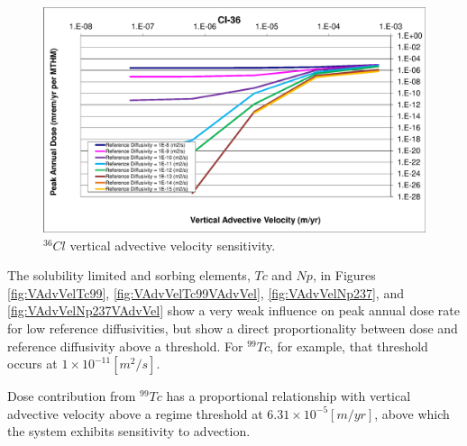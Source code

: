 \begin{figure}[htp!]
\begin{minipage}[b]{0.45\linewidth}
\centering
\includegraphics[width=\textwidth]{./chapters/nuclide_sensitivity/clay/AdvVelAndDiffCoeffEBSFail/Cl-36-VAdvVel.eps}
\caption{$^{36}Cl$ vertical advective velocity sensitivity.}
\label{fig:VAdvVelCl36VAdvVel}
\end{minipage}
\end{figure}

The solubility limited and sorbing elements, $Tc$ and $Np$, in Figures 
\ref{fig:VAdvVelTc99}, \ref{fig:VAdvVelTc99VAdvVel}, \ref{fig:VAdvVelNp237}, and 
\ref{fig:VAdvVelNp237VAdvVel} show a very weak influence on peak annual dose 
rate for low reference diffusivities, but show a direct proportionality between 
dose and reference diffusivity above a threshold. For $^{99}Tc$, for example, 
that threshold occurs at $1\times10^{-11}[m^2/s]$. 


Dose contribution from $^{99}Tc$ has a proportional 
relationship with vertical advective velocity above a regime threshold at 
$6.31\times10^{-5}[m/yr]$, above which the system exhibits sensitivity to 
advection. 


